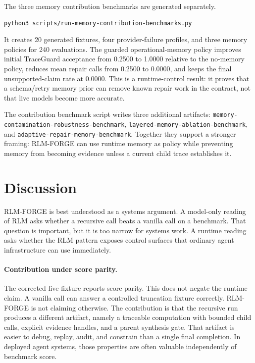 \documentclass[11pt,a4paper]{article}
\begin{document}
The three memory contribution benchmarks are generated separately.

\begin{lstlisting}[language=bash]
python3 scripts/run-memory-contribution-benchmarks.py
\end{lstlisting}

It creates 20 generated fixtures, four provider-failure profiles, and three
memory policies for 240 evaluations. The guarded operational-memory policy
improves initial TraceGuard acceptance from 0.2500 to 1.0000 relative to the
no-memory policy, reduces mean repair calls from 0.2500 to 0.0000, and keeps
the final unsupported-claim rate at 0.0000. This is a runtime-control result:
it proves that a schema/retry memory prior can remove known repair work in the
contract, not that live models become more accurate.

The contribution benchmark script writes three additional artifacts:
\texttt{memory-contamination-robustness-benchmark},
\texttt{layered-memory-ablation-benchmark}, and
\texttt{adaptive-repair-memory-benchmark}. Together they support a stronger
framing: RLM-FORGE can use runtime memory as policy while preventing memory
from becoming evidence unless a current child trace establishes it.

\section{Discussion}
\label{sec:discussion}

RLM-FORGE is best understood as a systems argument. A model-only reading of
RLM asks whether a recursive call beats a vanilla call on a benchmark. That
question is important, but it is too narrow for systems work. A runtime
reading asks whether the RLM pattern exposes control surfaces that ordinary
agent infrastructure can use immediately.

\paragraph{Contribution under score parity.}
The corrected live fixture reports score parity. This does not negate the
runtime claim. A vanilla call can answer a controlled truncation fixture
correctly. RLM-FORGE is not claiming otherwise. The contribution is that the
recursive run produces a different artifact, namely a traceable computation with
bounded child calls, explicit evidence handles, and a parent synthesis gate.
That artifact is easier to debug, replay, audit, and constrain than a single
final completion. In deployed agent systems, those properties are often
valuable independently of benchmark score.
\end{document}
